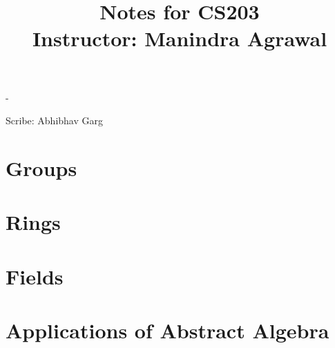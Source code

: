 \documentclass[a4paper,12pt]{memoir}
\title{Notes for CS203 \\ Instructor: Manindra Agrawal}
\author{}
\date{}
\begin{document}
\frontmatter
\begin{titlingpage}
  \calccentering{\unitlength}
  \begin{adjustwidth*}{\unitlength}{-\unitlength}
    \setlength{\droptitle}{30pt}
    \maketitle
  \end{adjustwidth*}
  \vspace*{\fill}
  \begin{flushright}
    Scribe: Abhibhav Garg
  \end{flushright}
\end{titlingpage}
\tableofcontents
\mainmatter
\chapter{Groups}

\chapter{Rings}

\chapter{Fields}

\chapter{Applications of Abstract Algebra}

\end{document}
